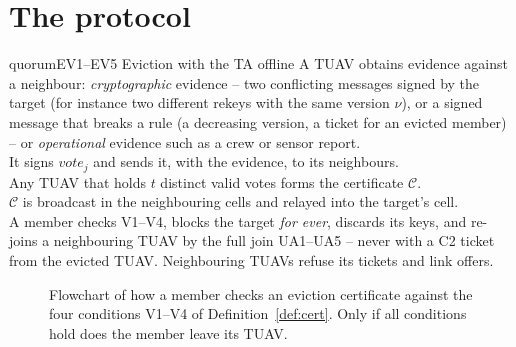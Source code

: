 \section{The protocol}
\begin{stepbox}{quorum}{EV1--EV5 \;Eviction with the TA offline}
 A TUAV obtains evidence against a neighbour: \emph{cryptographic} evidence -- two conflicting messages signed by
the target (for instance two different rekeys with the same version $\nu$), or a signed message that breaks a rule (a decreasing version, a ticket for
an evicted member) -- or \emph{operational} evidence such as a crew or sensor report.\\
 It signs $\mathit{vote}_j$ and sends it, with the evidence, to its neighbours.\\
 Any TUAV that holds $t$ distinct valid votes forms the certificate $\mathcal C$.\\
 $\mathcal C$ is broadcast in the neighbouring cells and relayed into the target's cell.\\
 A member checks V1--V4, blocks the target \emph{for ever}, discards its keys, and re-joins a neighbouring TUAV by the full
join UA1--UA5 -- never with a C2 ticket from the evicted TUAV. Neighbouring TUAVs refuse its tickets and link offers.
\end{stepbox}

\begin{figure}[H]
\centering
{}
\caption{Flowchart of how a member checks an eviction certificate against the four conditions V1--V4 of Definition~\ref{def:cert}. Only if all conditions hold does the member leave its TUAV.}
\label{fig:c3flow}
\end{figure}

